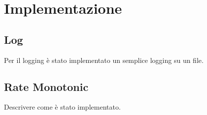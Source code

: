 \chapter{Implementazione}

\section{Log}
Per il logging è stato implementato un semplice logging su un file.

\section{Rate Monotonic}
Descrivere come è stato implementato.